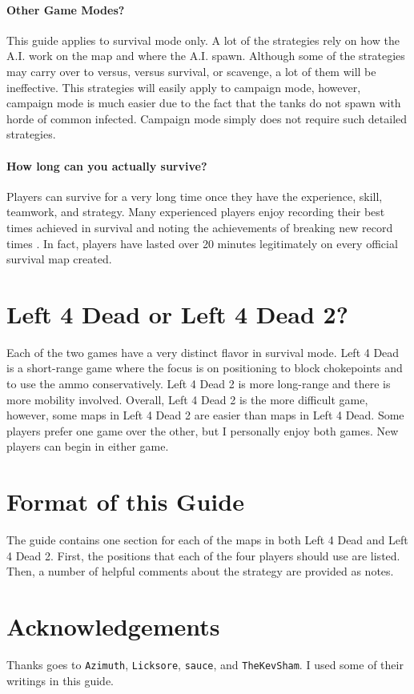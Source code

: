 \paragraph{Other Game Modes?}
This guide applies to survival mode only. A lot of the strategies rely on how the A.I. work on the map and where the A.I. spawn. Although some of the strategies may carry over to versus, versus survival, or scavenge, a lot of them will be ineffective. This strategies will easily apply to campaign mode, however, campaign mode is much easier due to the fact that the tanks do not spawn with horde of common infected. Campaign mode simply does not require such detailed strategies.

\paragraph{How long can you actually survive?}
Players can survive for a very long time once they have the experience, skill, teamwork, and strategy. Many experienced players enjoy recording their best times achieved in survival and noting the achievements of breaking new record times \cite{web:sv_stats}. In fact, players have lasted over 20 minutes legitimately on every official survival map created.

\section{Left 4 Dead or Left 4 Dead 2?}
Each of the two games have a very distinct flavor in survival mode. Left 4 Dead is a short-range game where the focus is on positioning to block chokepoints and to use the ammo conservatively. Left 4 Dead 2 is more long-range and there is more mobility involved. Overall, Left 4 Dead 2 is the more difficult game, however, some maps in Left 4 Dead 2 are easier than maps in Left 4 Dead. Some players prefer one game over the other, but I personally enjoy both games. New players can begin in either game.

\section{Format of this Guide}
The guide contains one section for each of the maps in both Left 4 Dead and Left 4 Dead 2. First, the positions that each of the four players should use are listed. Then, a number of helpful comments about the strategy are provided as notes.

\section{Acknowledgements}
Thanks goes to \texttt{Azimuth}, \texttt{Licksore}, \texttt{sauce}, and \texttt{TheKevSham}. I used some of their writings in this guide.
